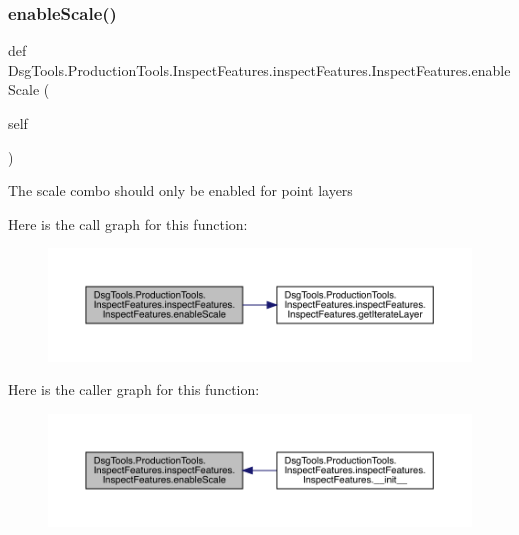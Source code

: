 \subsubsection{\texorpdfstring{enable\+Scale()}{enableScale()}}
{\footnotesize\ttfamily def Dsg\+Tools.\+Production\+Tools.\+Inspect\+Features.\+inspect\+Features.\+Inspect\+Features.\+enable\+Scale (\begin{DoxyParamCaption}\item[{}]{self }\end{DoxyParamCaption})}

\begin{DoxyVerb}The scale combo should only be enabled for point layers
\end{DoxyVerb}
 Here is the call graph for this function\+:
\nopagebreak
\begin{figure}[H]
\begin{center}
\leavevmode
\includegraphics[width=350pt]{class_dsg_tools_1_1_production_tools_1_1_inspect_features_1_1inspect_features_1_1_inspect_features_a4895b41587166867074d29d9667b382b_cgraph}
\end{center}
\end{figure}
Here is the caller graph for this function\+:
\nopagebreak
\begin{figure}[H]
\begin{center}
\leavevmode
\includegraphics[width=350pt]{class_dsg_tools_1_1_production_tools_1_1_inspect_features_1_1inspect_features_1_1_inspect_features_a4895b41587166867074d29d9667b382b_icgraph}
\end{center}
\end{figure}
\mbox{\label{class_dsg_tools_1_1_production_tools_1_1_inspect_features_1_1inspect_features_1_1_inspect_features_a6346e3767e0187d8350e3eb1647d9e0b}} 
